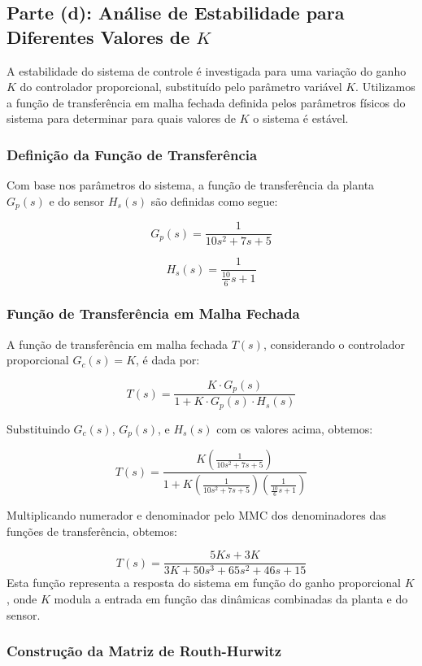 \subsection{Parte (d): Análise de Estabilidade para Diferentes Valores de \(K\)}

A estabilidade do sistema de controle é investigada para uma variação do ganho \(K\) do controlador proporcional, substituído pelo parâmetro variável \(K\). Utilizamos a função de transferência em malha fechada definida pelos parâmetros físicos do sistema para determinar para quais valores de \(K\) o sistema é estável.

\subsubsection{Definição da Função de Transferência}
Com base nos parâmetros do sistema, a função de transferência da planta \(G_p(s)\) e do sensor \(H_s(s)\) são definidas como segue:

\[
    G_p(s) = \frac{1}{10 s^2 + 7 s + 5}
\]

\[
    H_s(s) = \frac{1}{\frac{10}{6} s + 1}
\]

\subsubsection{Função de Transferência em Malha Fechada}
A função de transferência em malha fechada \(T(s)\), considerando o controlador proporcional \(G_c(s) = K\), é dada por:

\[
    T(s) = \frac{K \cdot G_p(s)}{1 + K \cdot G_p(s) \cdot H_s(s)}
\]

Substituindo \(G_c(s)\), \(G_p(s)\), e \(H_s(s)\) com os valores acima, obtemos:

\[
    T(s) = \frac{K \left(\frac{1}{10 s^2 + 7 s + 5}\right)}{1 + K \left(\frac{1}{10 s^2 + 7 s + 5}\right) \left(\frac{1}{\frac{10}{6}s + 1}\right)}
\]

Multiplicando numerador e denominador pelo MMC dos denominadores das funções de transferência, obtemos:

\[
    T(s) = \frac{5Ks + 3K}{3K + 50s^3 + 65s^2 + 46s + 15}
\]
Esta função representa a resposta do sistema em função do ganho proporcional \(K\), onde \(K\) modula a entrada em função das dinâmicas combinadas da planta e do sensor.

\subsubsection{Construção da Matriz de Routh-Hurwitz}

